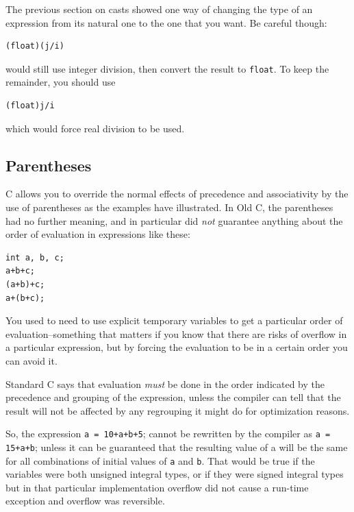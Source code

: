    The previous section on casts showed one way of changing the type of an
    expression from its natural one to the one that you want. Be careful
    though:


   \begin{Verbatim}
(float)(j/i)
\end{Verbatim}

   would still use integer division, then convert the result to
    \texttt{float}. To keep the remainder, you should use


   \begin{Verbatim}
(float)j/i
\end{Verbatim}

   which would force real division to be used.


  

  \subsection{Parentheses}
   

   C allows you to override the normal effects of precedence and
    associativity by the use of parentheses as the examples have illustrated.
    In Old C, the parentheses had no further meaning, and in particular
    did \textit{not} guarantee anything about the order of evaluation in
    expressions like these:


   \begin{Verbatim}
int a, b, c;
a+b+c;
(a+b)+c;
a+(b+c);
\end{Verbatim}

   You used to need to use explicit temporary variables to get a particular
    order of evaluation--something that matters if you know that there
    are risks of overflow in a particular expression, but by forcing the
    evaluation to be in a certain order you can avoid it.


   Standard C says that evaluation \textit{must} be done in the order
    indicated by the precedence and grouping of the expression, unless the
    compiler can tell that the result will not be affected by any regrouping
    it might do for optimization reasons.


   So, the expression \texttt{a = 10+a+b+5}; cannot be rewritten
    by the compiler as \texttt{a = 15+a+b}; unless it can be
    guaranteed that the resulting value of a will be the same for all
    combinations of initial values of \texttt{a}
    and \texttt{b}. That would be true if the variables were both
    unsigned integral types, or if they were signed integral types but in that
    particular implementation overflow did not cause a run-time exception and
    overflow was reversible.


